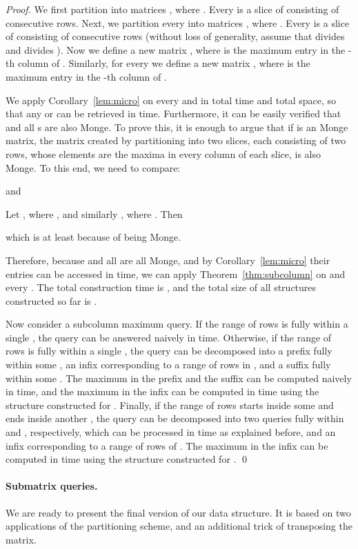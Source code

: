 \documentclass{llncs}
\begin{document}
\begin{proof}
We first partition  into  matrices
, where .
Every  is a slice of  consisting of  consecutive rows. Next,  we partition
every  into  matrices , where .
Every  is a slice of  consisting of  consecutive rows (without loss of generality, assume that  divides  and  divides ).
Now we define a new  matrix , where  is the maximum
entry in the -th column of . Similarly, for every  we define
a new  matrix , where  is the maximum entry
in the -th column of .

We apply Corollary~\ref{lem:micro} on every  and  in  total time
and  total space, so that any  or  can be retrieved in  time. Furthermore,
it can be easily verified that  and all s are also Monge. 
To prove this, it is enough to argue that if  is an 
Monge matrix,
the  matrix  created by partitioning  into two
slices, each consisting
of two rows, whose elements are the maxima in every column of each slice, is also
Monge. To this end, we need to compare:

and

Let , where , and similarly
, where . Then

which is at least  because of  being Monge.
  
Therefore, because  and all  are all Monge, and
by Corollary~\ref{lem:micro} their entries can be accessed in  time, 
we can apply Theorem~\ref{thm:subcolumn} on 
and every . The total construction time is 
, 
and the total size of all structures constructed so far is 
.

Now consider a subcolumn maximum query. If the range of rows is fully within a single
, the query can be answered naively in  time.
Otherwise, if the range of rows is fully within a single , the query can be decomposed
into a prefix fully within some , an infix corresponding to a range of rows
in , and a suffix fully within some . The maximum in the prefix and the suffix can
be computed naively in  time, and the maximum in the infix
can be computed in  time using the structure constructed for .
Finally, if the range of rows starts inside some  and ends inside another ,
the query can be decomposed into two queries fully within  and , respectively,
which can be processed in  time as explained before, and an infix
corresponding to a range of rows of . The maximum in the infix can be computed
in  time using the structure constructed for .
\qed \end{proof}

\paragraph{\bf Submatrix queries.}
We are ready to present the final version of our data structure. It is based on two
applications of the partitioning scheme, and an additional trick of transposing the matrix.
\end{document}
